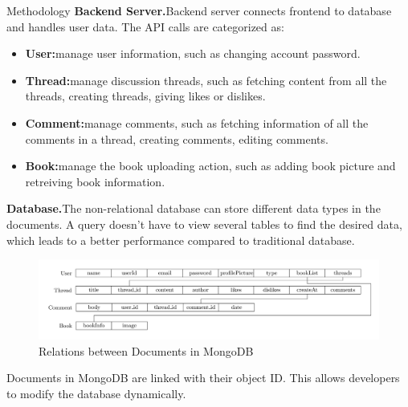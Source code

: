 \begin{block}{Methodology}
\textbf{Backend Server.\space}Backend server connects frontend to database and handles user data. The API calls are categorized as:\\
\begin{itemize}
    \item \textbf{User:\space}manage user information, such as changing account password.
    \item \textbf{Thread:\space}manage discussion threads, such as fetching content from all the threads, creating threads, giving likes or dislikes.
    \item \textbf{Comment:\space}manage comments, such as fetching information of all the comments in a thread, creating comments, editing comments.
    \item \textbf{Book:\space}manage the book uploading action, such as adding book picture and retreiving book information. 
\end{itemize}
\textbf{Database.\space}The non-relational database can store different data types in the documents. A query doesn’t have to view several tables to find the desired data, which leads to a better performance compared to traditional database.
\begin{figure}
    \includegraphics[width=1\linewidth]{database.png}
    \caption{Relations between Documents in MongoDB}
\end{figure}
\vspace{-1.0cm}
Documents in MongoDB are linked with their object ID. This allows developers to modify the database dynamically.
\end{block}